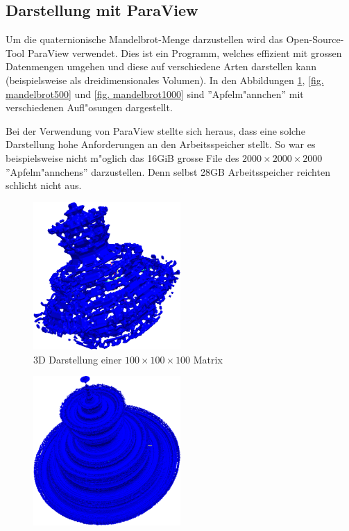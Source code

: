 \begin{refsection}
\subsection{Darstellung mit ParaView}
Um die quaternionische Mandelbrot-Menge darzustellen wird das
Open-Source-Tool ParaView verwendet. Dies ist ein Programm, welches
effizient mit grossen Datenmengen umgehen und diese auf verschiedene
Arten darstellen kann (beispielsweise als dreidimensionales Volumen). In
den Abbildungen \ref{fig. mandelbrot100}, \ref{fig. mandelbrot500}
und \ref{fig. mandelbrot1000} sind ''Apfelm"annchen'' mit verschiedenen
Aufl"osungen dargestellt.

Bei der Verwendung von ParaView stellte sich heraus, dass eine solche
Darstellung hohe Anforderungen an den Arbeitsspeicher stellt. So
war es beispielsweise nicht m"oglich das 16GiB grosse File des
$2000\times2000\times 2000$ ''Apfelm"annchens'' darzustellen. Denn selbst
28GB Arbeitsspeicher reichten schlicht nicht aus.
\begin{figure}[ht!]\centering
	\includegraphics[width=0.5\textwidth]{apfel/pic/v1_100.png}
	\caption{3D Darstellung einer $100\times100\times 100$ Matrix}
	\label{fig. mandelbrot100}
\end{figure}
\begin{figure}[ht!]\centering
	\includegraphics[width=0.5\textwidth]{apfel/pic/v2_500.png}

\end{figure}
\end{refsection}
